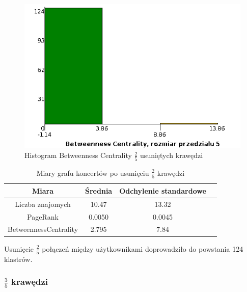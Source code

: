 \documentclass[10pt,a4paper]{article}
\begin{document}
\begin{figure}[H]
\centering
\caption{Histogram Betweenness Centrality $\frac{2}{5}$ usuniętych krawędzi}
\includegraphics[scale=0.6]{wyniki/final200Events/2200eventsBCHist.png}
\end{figure}


\begin{table}[H]
  \caption{Miary grafu koncertów po usunięciu $\frac{2}{5}$ krawędzi}
  \centering
    \begin{tabular}{cccc}
    \addlinespace
    \toprule
    Miara & Średnia  & Odchylenie standardowe \\
    \midrule
    Liczba znajomych & 10.47 & 13.32 \\
    PageRank & 0.0050 & 0.0045 \\
    BetweennessCentrality & 2.795 & 7.84\\ 
    \bottomrule
    \end{tabular}
  \label{tab:addlabel}
\end{table}

Usunięcie $\frac{2}{5}$ połączeń między użytkownikami doprowadziło do powstania 124 klastrów. 

\subsubsection {$\frac{3}{5}$ krawędzi}
\end{document}
